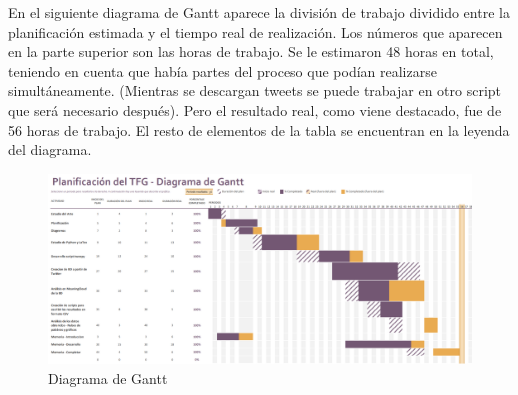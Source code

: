 %	
En el siguiente diagrama de Gantt aparece la división de trabajo dividido entre la planificación estimada y el tiempo real de realización. Los números que aparecen en la parte superior son las horas de trabajo. Se le estimaron 48 horas en total, teniendo en cuenta que había partes del proceso que podían realizarse simultáneamente. (Mientras se descargan tweets se puede trabajar en otro script que será necesario después). Pero el resultado real, como viene destacado, fue de 56 horas de trabajo. El resto de elementos de la tabla se encuentran en la leyenda del diagrama. 

\begin{figure}[H]
	\centering
	\includegraphics[scale=.45]{imagenes/ganttzoom.png}
	\caption{Diagrama de Gantt}
	\label{fig:gantt}
\end{figure}
















